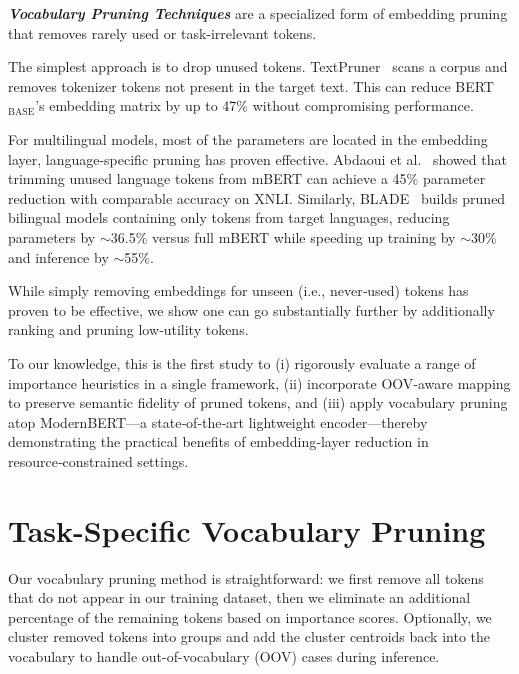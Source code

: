 \documentclass[twocolumn]{article}
\begin{document}
\textit{\textbf{Vocabulary Pruning Techniques}} are a specialized form of embedding pruning that removes rarely used or task-irrelevant tokens.

The simplest approach is to drop unused tokens. TextPruner~\cite{shen2022textpruner} scans a corpus and removes tokenizer tokens not present in the target text. This can reduce BERT$_{\text{BASE}}$'s embedding matrix by up to 47\% without compromising performance.

For multilingual models, most of the parameters are located in the embedding layer, language-specific pruning has proven effective. Abdaoui et al.~\cite{abdaoui2020load} showed that trimming unused language tokens from mBERT can achieve a 45\% parameter reduction with comparable accuracy on XNLI. Similarly, BLADE~\cite{nair2023blade} builds pruned bilingual models containing only tokens from target languages, reducing parameters by $\sim$36.5\% versus full mBERT while speeding up training by $\sim$30\% and inference by $\sim$55\%.

While simply removing embeddings for unseen (i.e., never‑used) tokens has proven to be effective, we show one can go substantially further by additionally ranking and pruning low‑utility tokens. 

To our knowledge, this is the first study to (i) rigorously evaluate a range of importance heuristics in a single framework, (ii) incorporate OOV‑aware mapping to preserve semantic fidelity of pruned tokens, and (iii) apply vocabulary pruning atop ModernBERT—a state‑of‑the‑art lightweight encoder—thereby demonstrating the practical benefits of embedding‑layer reduction in resource‑constrained settings.

\newpage
\section{\fontsize{13}{15.6}\selectfont Task-Specific Vocabulary Pruning}
Our vocabulary pruning method is straightforward: we first remove all tokens that do not appear in our training dataset, then we eliminate an additional percentage of the remaining tokens based on importance scores. 
Optionally, we cluster removed tokens into groups and add the cluster centroids back into the vocabulary to handle out-of-vocabulary (OOV) cases during inference.
\end{document}
